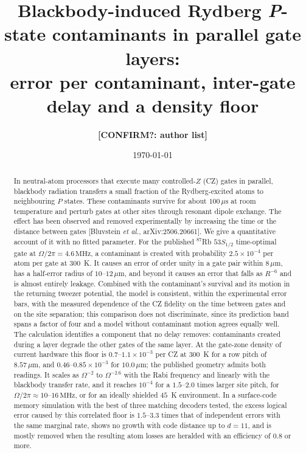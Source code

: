 \documentclass[aps,pra,twocolumn,superscriptaddress,longbibliography,floatfix]{revtex4-2}
\newcommand{\um}{\,\mu\mathrm{m}}
\newcommand{\us}{\,\mu\mathrm{s}}
\newcommand{\MHz}{\,\mathrm{MHz}}
\newcommand{\todo}[1]{\textbf{[#1]}}
\begin{document}
\title{Blackbody-induced Rydberg \textit{P}-state contaminants in parallel gate layers:\\ error per contaminant, inter-gate delay and a density floor}

\author{\todo{CONFIRM?: author list}}
\affiliation{\todo{CONFIRM?: affiliation}}

\date{\today}

\begin{abstract}
In neutral-atom processors that execute many controlled-$Z$ (CZ) gates in parallel, blackbody radiation transfers a small fraction of the Rydberg-excited atoms to neighbouring $P$ states. These contaminants survive for about $100\us$ at room temperature and perturb gates at other sites through resonant dipole exchange. The effect has been observed and removed experimentally by increasing the time or the distance between gates [Bluvstein \textit{et al.}, arXiv:2506.20661]. We give a quantitative account of it with no fitted parameter. For the published $^{87}$Rb $53S_{1/2}$ time-optimal gate at $\Omega/2\pi=4.6\MHz$, a contaminant is created with probability $2.5\times10^{-4}$ per atom per gate at $300$~K. It causes an error of order unity in a gate pair within $8\um$, has a half-error radius of $10$--$12\um$, and beyond it causes an error that falls as $R^{-6}$ and is almost entirely leakage. Combined with the contaminant's survival and its motion in the returning tweezer potential, the model is consistent, within the experimental error bars, with the measured dependence of the CZ fidelity on the time between gates and on the site separation; this comparison does not discriminate, since its prediction band spans a factor of four and a model without contaminant motion agrees equally well. The calculation identifies a component that no delay removes: contaminants created during a layer degrade the other gates of the same layer. At the gate-zone density of current hardware this floor is $0.7$--$1.1\times10^{-3}$ per CZ at $300$~K for a row pitch of $8.57\um$, and $0.46$--$0.85\times10^{-3}$ for $10.0\um$; the published geometry admits both readings. It scales as $\Omega^{-2}$ to $\Omega^{-2.6}$ with the Rabi frequency and linearly with the blackbody transfer rate, and it reaches $10^{-4}$ for a $1.5$--$2.0$ times larger site pitch, for $\Omega/2\pi\approx10$--$16\MHz$, or for an ideally shielded $45$~K environment. In a surface-code memory simulation with the best of three matching decoders tested, the excess logical error caused by this correlated floor is $1.5$--$3.3$ times that of independent errors with the same marginal rate, shows no growth with code distance up to $d=11$, and is mostly removed when the resulting atom losses are heralded with an efficiency of $0.8$ or more.
\end{abstract}
\end{document}
